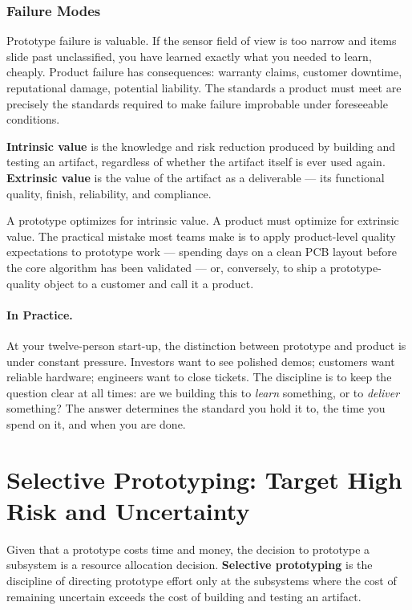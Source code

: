 \subsubsection{Failure Modes}
Prototype failure is valuable.
If the sensor field of view is too narrow and items slide past unclassified,
you have learned exactly what you needed to learn, cheaply.
Product failure has consequences: warranty claims, customer downtime,
reputational damage, potential liability.
The standards a product must meet are precisely the standards required to make
failure improbable under foreseeable conditions.

\textbf{Intrinsic value} is the knowledge and risk
reduction produced by building and testing an artifact, regardless of whether
the artifact itself is ever used again.
\textbf{Extrinsic value} is the value of the artifact
as a deliverable --- its functional quality, finish, reliability, and
compliance.

A prototype optimizes for intrinsic value.
A product must optimize for extrinsic value.
The practical mistake most teams make is to apply product-level quality
expectations to prototype work --- spending days on a clean PCB layout before
the core algorithm has been validated --- or, conversely, to ship a
prototype-quality object to a customer and call it a product.

\paragraph{In Practice.}
At your twelve-person start-up, the distinction between prototype and product
is under constant pressure.
Investors want to see polished demos; customers want reliable hardware;
engineers want to close tickets.
The discipline is to keep the question clear at all times: are we building
this to \emph{learn} something, or to \emph{deliver} something?
The answer determines the standard you hold it to, the time you spend on it,
and when you are done.


\section{Selective Prototyping: Target High Risk and Uncertainty}
\label{sec:ch3-selective-prototyping}

Given that a prototype costs time and money, the decision to prototype a
subsystem is a resource allocation decision.
\textbf{Selective prototyping} is the discipline
of directing prototype effort only at the subsystems where the cost of
remaining uncertain exceeds the cost of building and testing an artifact.

